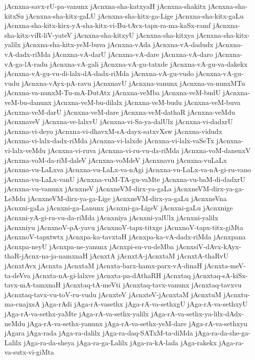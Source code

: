 {jAcnxna-savx-rU-pa-vanunx
jAcnxna-sha-katxyaH
jAcnxna-shakitx
jAcnxna-sha-kitxSu
jAcnxna-sha-kitx-gaLU
jAcnxna-sha-kitx-ga-Lige
jAcnxna-sha-kitx-gaLu
jAcnxna-sha-kitx-kirx-yA-sha-kitx-vi-Bu-tAvx-tapx-ra-ma-kaSx-ramf
jAcnxna-sha-kitx-viR-liV-yateV
jAcnxna-sha-kitxyU
jAcnxna-sha-kitxya
jAcnxna-sha-kitx-yalilx
jAcnxna-sha-kitx-yeM-buva
jAcnxna-vAda
jAcnxna-vA-dadudx
jAcnxna-vA-dadx-riMda
jAcnxna-vA-darU
jAcnxna-vA-dare
jAcnxna-vA-daro
jAcnxna-vA-ga-lA-radu
jAcnxna-vA-gali
jAcnxna-vA-gu-tatxde
jAcnxna-vA-gu-va-dakekx
jAcnxna-vA-gu-vu-di-lalx-dA-dadx-riMda
jAcnxna-vA-gu-vudo
jAcnxna-vA-gu-vudu
jAcnxna-vAyx-pA-ravu
jAcnxnavU
jAcnxna-vanunx
jAcnxna-va-nunxMTu
jAcnxna-va-nunxM-Tu-mA-DutAtx
jAcnxna-veMba
jAcnxna-veM-budU
jAcnxna-veM-bu-danunx
jAcnxna-veM-bu-dilalx
jAcnxna-veM-budu
jAcnxna-veM-buva
jAcnxna-veM-darU
jAcnxna-veM-dare
jAcnxna-veM-dathaR
jAcnxna-veMdu
jAcnxnaveV
jAcnxna-ve-lalxvU
jAcnxna-vi-Sa-ya-dalUlx
jAcnxna-vi-dadxrU
jAcnxna-vi-deyo
jAcnxna-vi-dhavxM-sA-dayx-satxvXsw
jAcnxna-vidudx
jAcnxna-vi-lalx-dadx-riMda
jAcnxna-vi-lalxde
jAcnxna-vi-lalx-vaSeTx
jAcnxna-vi-lalx-veMdu
jAcnxna-vi-ruva
jAcnxna-vi-ru-vu-da-riMda
jAcnxna-voM-danenxV
jAcnxna-voM-da-riM-daleV
jAcnxna-voMdeV
jAcnxnavu
jAcnxna-vuLaLx
jAcnxna-vu-LaLxva
jAcnxna-vu-LaLx-va-nAgi
jAcnxna-vu-LaLx-va-nA-gi-ru-vano
jAcnxna-vu-LaLx-vanU
jAcnxna-vuM-TA-gu-vaMte
jAcnxna-vu-baM-di-dadxrU
jAcnxna-vu-vanunx
jAcnxneV
jAcnxneVM-dirx-ya-gaLa
jAcnxneVM-dirx-ya-ga-LeMdu
jAcnxneVM-dirx-ya-ga-Lige
jAcnxneVM-dirx-ya-gaLu
jAcnxneVna
jAcnxni-gaLa
jAcnxni-ga-Lanunx
jAcnxni-ga-LigeV
jAcnxni-gaLu
jAcnxnige
jAcnxni-yA-gi-ru-vu-da-riMda
jAcnxniya
jAcnxni-yalUlx
jAcnxni-yalilx
jAcnxniyu
jAcnxnoV-pA-yavu
jAcnxnoV-tapx-titxge
jAcnxnoV-tapx-titx-giMta
jAcnxnoV-tapxtwtx
jAcnxpa-ka-tavxtaH
jAcnxpa-ka-vA-dadx-riMda
jAcnxpana
jAcnxpa-neyU
jAcnxpa-ne-yanunx
jAcnxpi-su-vu-deMba
jAcnxsiV-dAvx-kAyx-thaR-jAcnx-na-ja-namxnaH
jAcnxtA
jAcnxtA-jAcnxtaM
jAcnxtA-thaRvU
jAcnxtAvx
jAcnxta
jAcnxtaM
jAcnxta-barx-hamx-parx-vA-dinaH
jAcnxta-meV-ta-deVva
jAcnxta-nA-gi-lalxve
jAcnxta-pa-dAthaRH
jAcnxtaq
jAcnxtaq-sA-kiSx-tavx-mA-tamxnaH
jAcnxtaq-tA-meVti
jAcnxtaq-tavx-vanunx
jAcnxtaq-tavxvu
jAcnxtaq-tavx-vu-toV-ru-vudu
jAcnxteV
jAcnxteV-jAcnxtaM
jAcnxtuM
jAcnxtu-ma-cnajxsA
jAga-rAdi
jAga-rA-vasethx
jAga-rA-va-sethxgU
jAga-rA-va-sethxyU
jAga-rA-va-sethx-yaMte
jAga-rA-va-sethx-yalilx
jAga-rA-va-sethx-ya-lilx-dAdx-neMdu
jAga-rA-va-sethx-yanunx
jAga-rA-va-sethx-yeM-dare
jAga-rA-va-sethxyu
jAgara
jAga-rada
jAga-ra-dalilx
jAga-ra-daq-SATxM-ta-diMda
jAga-ra-da-she-ga-Lalilx
jAga-ra-da-sheya
jAga-ra-ga-Lalilx
jAga-ra-kA-lada
jAga-rakekx
jAga-ra-va-sutx-vi-giMta
}
